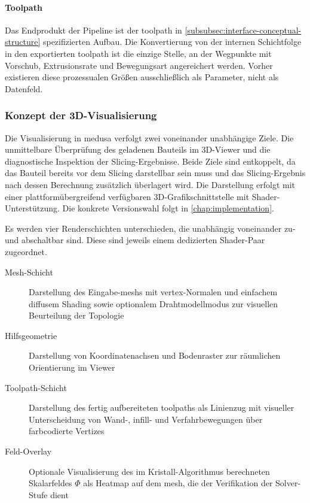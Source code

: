                 \paragraph{Toolpath}
                    Das Endprodukt der Pipeline ist der \gls{toolpath} in \cref{subsubsec:interface-conceptual-structure} spezifizierten Aufbau.
                    Die Konvertierung von der internen Schichtfolge in den exportierten \gls{toolpath} ist die einzige Stelle, an der Wegpunkte mit Vorschub, Extrusionsrate und Bewegungsart angereichert werden.
                    Vorher existieren diese prozessualen Größen ausschließlich als Parameter, nicht als Datenfeld.

            \subsubsection{Konzept der 3D-Visualisierung}\label{subsubsec:concept-medusa-visualization} 
                Die Visualisierung in \ac{medusa} verfolgt zwei voneinander unabhängige Ziele.
                Die unmittelbare Überprüfung des geladenen Bauteils im 3D-Viewer und die diagnostische Inspektion der Slicing-Ergebnisse.
                Beide Ziele sind entkoppelt, da das Bauteil bereits vor dem Slicing darstellbar sein muss und das Slicing-Ergebnis nach dessen Berechnung zusätzlich überlagert wird.
                Die Darstellung erfolgt mit einer platt\-form\-übergreifend verfügbaren 3D-Grafikschnittstelle mit Shader-Unterstützung.
                Die konkrete Versionswahl folgt in \cref{chap:implementation}.

                Es werden vier Renderschichten unterschieden, die unabhängig voneinander zu- und abschaltbar sind.
                Diese sind jeweils einem dedizierten Shader-Paar zugeordnet.
                \begin{description}
                    \item[Mesh-Schicht] Darstellung des Eingabe-\glspl{mesh} mit \gls{vertex}-Normalen und einfachem diffusem Shading sowie optionalem Drahtmodellmodus zur visuellen Beurteilung der Topologie
                    \item[Hilfsgeometrie] Darstellung von Koordinatenachsen und Bodenraster zur räumlichen Orientierung im Viewer
                    \item[Toolpath-Schicht] Darstellung des fertig aufbereiteten \glspl{toolpath} als Linienzug mit visueller Unterscheidung von Wand-, \gls{infill}- und Verfahrbewegungen über farbcodierte Vertizes
                    \item[Feld-Overlay] Optionale Visualisierung des im Kristall-Algorithmus berechneten Skalarfeldes $\Phi$ als Heatmap auf dem \gls{mesh}, die der Verifikation der Solver-Stufe dient
                \end{description}

